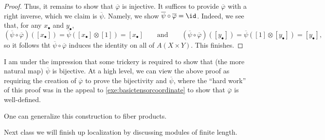 \begin{proof}
	Thus, it remains to show that $\overline\varphi$ is injective. It suffices to provide $\overline\varphi$ with a right inverse, which we claim is $\overline\psi$. Namely, we show $\overline\psi\circ\overline\varphi=\id$. Indeed, we see that, for any $x_\bullet$ and $y_\bullet$,
	\[(\overline\psi\circ\overline\varphi)([x_\bullet])=\overline\psi([x_\bullet]\otimes[1])=[x_\bullet]\qquad\text{and}\qquad(\overline\psi\circ\overline\varphi)([y_\bullet])=\overline\psi([1]\otimes[y_\bullet])=[y_\bullet],\]
	so it follows tht $\overline\psi\circ\overline\varphi$ induces the identity on all of $A(X\times Y)$. This finishes.
\end{proof}
\begin{remark}[Nir]
	I am under the impression that some trickery is required to show that (the more natural map) $\overline\psi$ is bijective. At a high level, we can view the above proof as requiring the creation of $\overline\varphi$ to prove the bijectivity and $\overline\psi$, where the ``hard work'' of this proof was in the appeal to \autoref{exe:basictensorcoordinate} to show that $\overline\varphi$ is well-defined.
\end{remark}
\begin{remark}
	One can generalize this construction to fiber products.
\end{remark}
Next class we will finish up localization by discussing modules of finite length.